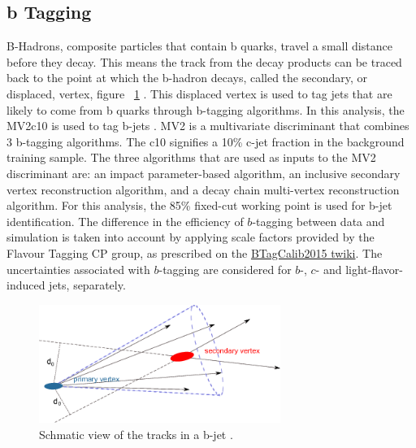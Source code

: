 \subsection{b Tagging}\label{ssec:btag}
B-Hadrons, composite particles that contain b quarks, travel a small distance before they decay. This means the track from the decay products can be traced back to the point at which the b-hadron decays, called the secondary, or displaced, vertex, figure ~\ref{fig:bjets} . This displaced vertex is used to tag jets that are likely to come from b quarks through b-tagging algorithms.\newline
\indent In this analysis, the MV2c10 is used to tag b-jets \cite{ATL-PHYS-PUB-2016-012}. MV2 is a multivariate discriminant that combines 3 b-tagging algorithms. The c10 signifies a 10\% c-jet fraction in the background training sample. The three algorithms that are used as inputs to the MV2 discriminant are: an impact parameter-based algorithm, an inclusive secondary vertex reconstruction algorithm, and a decay chain multi-vertex reconstruction algorithm. For this analysis, the 85\% fixed-cut working point is used for b-jet identification.\newline
The difference in the efficiency of $b$-tagging between data and simulation 
is taken into account by applying scale factors provided by the Flavour Tagging CP group, 
as prescribed on the \href{https://twiki.cern.ch/twiki/bin/view/AtlasProtected/BTagCalib2015}{BTagCalib2015 twiki}. 
The uncertainties associated with $b$-tagging are considered for $b$-, $c$- and light-flavor-induced jets, separately. 

\begin{figure}[h]
\begin{center}
\includegraphics*[width=0.70\textwidth] {figures/bjet}
\caption[Schmatic view of the tracks in a b-jet]{Schmatic view of the tracks in a b-jet \cite{HanssonAdrian:1397942}.}
\label{fig:bjets}
\end{center}
\end{figure}

